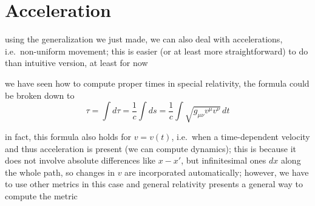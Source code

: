 \newpage



	\section{Acceleration}%
using the generalization we just made, we can also deal with accelerations, i.e.~non-uniform movement; this is easier (or at least more straightforward) to do than intuitive version, at least for now


we have seen how to compute proper times in special relativity, the formula could be broken down to 
\begin{equation}
\tau = \int d\tau = \frac{1}{c} \int ds = \frac{1}{c} \int \sqrt{g_{\mu \nu} v^\mu v^\nu} \, dt
\end{equation}

in fact, this formula also holds for $v = v(t)$, i.e.~when a time-dependent velocity and thus acceleration is present (we can compute dynamics); this is because it does not involve absolute differences like $x - x'$, but infinitesimal ones $dx$ along the whole path, so changes in $v$ are incorporated automatically; however, we have to use other metrics in this case and general relativity presents a general way to compute the metric




